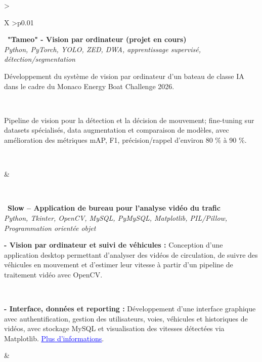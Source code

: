 \documentclass[letterpaper,8pt]{extarticle}
\newcommand{\indentbox}[2][1em]{\hspace*{#1}\parbox{\dimexpr\linewidth-#1\relax}{#2}}
\begin{document}
  \begin{tabularx}{\textwidth}{>{\raggedright\arraybackslash}X >{\raggedleft\arraybackslash}p{0.01\textwidth}}
  
    \begin{minipage}[t]{\linewidth}\raggedright
      \textbullet\ \textbf{"Tameo" - Vision par ordinateur (projet en cours)}\\
      \textit{\footnotesize Python, PyTorch, YOLO, ZED, DWA, apprentissage supervisé, détection/segmentation}\\
      \indentbox{\footnotesize Développement du système de vision par 
      ordinateur d'un bateau de classe IA dans le cadre 
      du Monaco Energy Boat Challenge 2026.}\\
      \indentbox{\footnotesize Pipeline de vision pour la détection et la décision de mouvement; fine-tuning sur datasets spécialisés, data augmentation et comparaison de modèles, avec amélioration des métriques mAP, F1, précision/rappel d'environ 80 \% à 90 \%.}\\
    \end{minipage}
    &
    \begin{minipage}[t]{\linewidth}\raggedleft %
    \end{minipage}\\

    \begin{minipage}[t]{\linewidth}\raggedright
      \textbullet\ \textbf{Slow -- Application de bureau pour l'analyse vidéo du trafic}\\
      \textit{\footnotesize Python, Tkinter, OpenCV, MySQL, PyMySQL, Matplotlib, PIL/Pillow, Programmation orientée objet}\\
      \indentbox{\footnotesize \textbf{- Vision par ordinateur et suivi de véhicules : } Conception d'une application desktop permettant d'analyser des vidéos de circulation, de suivre des véhicules en mouvement et d'estimer leur vitesse à partir d'un pipeline de traitement vidéo avec OpenCV.}\\
      \indentbox{\footnotesize \textbf{- Interface, données et reporting : } Développement d'une interface graphique avec authentification, gestion des utilisateurs, voies, véhicules et historiques de vidéos, avec stockage MySQL et visualisation des vitesses détectées via Matplotlib. 
      \href{https://github.com/JavierTarazona06/slow}{\textcolor{blue}{\underline{Plus d'informations}}}.}
    \end{minipage}
    &
    \begin{minipage}[t]{\linewidth}\raggedleft %
    \end{minipage}\\


\end{tabularx}
\end{document}
